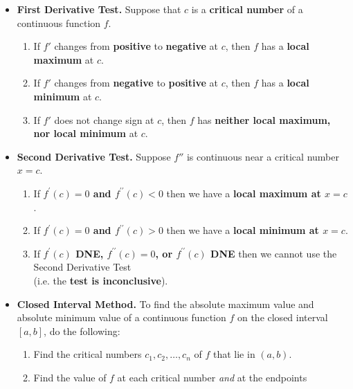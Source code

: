 \documentclass[11pt]{article}
\begin{document}
\begin{enumerate}
\begin{itemize}
\item\textbf{First Derivative Test.}
Suppose that $c$ is a
\textbf{critical number}
of a continuous function $f$.
\begin{enumerate}
\item
If $f'$ changes from
\textbf{positive}
to
\textbf{negative}
at $c$, then $f$ has a
\textbf{local maximum} at $c$.
\item
If $f'$ changes from
\textbf{negative}
to
\textbf{positive}
at $c$, then $f$ has a
\textbf{local minimum}
at $c$.
\item
If $f'$ does not change sign at $c$,
then $f$ has
\textbf{neither local maximum, nor local minimum}
at $c$.
\end{enumerate}
\vfill
\item\textbf{Second Derivative Test.}
Suppose $f''$ is continuous near a critical number $x=c$.
\begin{enumerate}
\item
If \textbf{$f^{\prime}(c)=0$ and $f^{\prime\prime}(c)<0$}
then we have a
\textbf{local maximum at $x=c$}.
\item
If \textbf{$f^{\prime}(c)=0$ and $f^{\prime\prime}(c)>0$}
then we have a
\textbf{local minimum at $x=c$}.
\item
If \textbf{$f^{\prime}(c)$ DNE,
$f^{\prime\prime}(c)=0$, or
$f^{\prime\prime}(c)$ DNE}
then we cannot use the Second Derivative Test\\
(i.e. the \textbf{test is inconclusive}).
\end{enumerate}
\vfill
\item
\textbf{Closed Interval Method.}
To find the absolute maximum value and absolute minimum value of a continuous function $f$ on the closed interval $[a, b]$, do the following:
\smallskip

\begin{minipage}{0.75\textwidth}
\begin{enumerate}
\item  Find the critical numbers $c_1, c_2, \ldots, c_n$ of $f$ that lie in $(a, b)$.
\item  Find the value of $f$ at each critical number {\em and} at the endpoints



\end{enumerate}
\end{minipage}
\end{itemize}
\end{enumerate}
\end{document}
